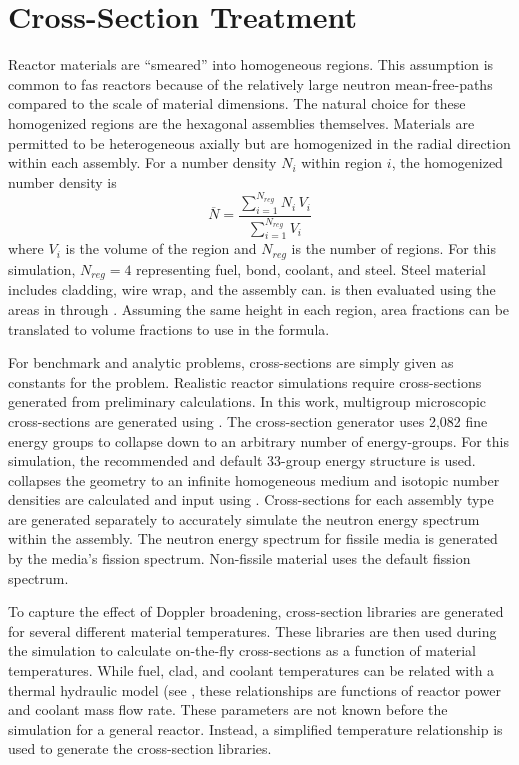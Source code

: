 \section{Cross-Section Treatment}
  \label{sec:cross_section_treatment}
  Reactor materials are ``smeared'' into homogeneous regions. This assumption is 
  common to fas reactors because of the relatively large neutron mean-free-paths
  compared to the scale of material dimensions. 
  The natural choice for these homogenized regions are the hexagonal
  assemblies themselves. Materials are permitted to be heterogeneous axially but
  are homogenized in the radial direction within each assembly. For a number
  density $N_i$ within region $i$, the homogenized number density is
  \begin{equation}
    \label{eq:homogenized_nden}
    \overline{N} = \frac{\sum_{i = 1}^{N_{reg}} N_i \, V_i}
      {\sum_{i=1}^{N_{reg}} V_i}
  \end{equation}
  where $V_i$ is the volume of the region and $N_{reg}$ is the number of
  regions. For this simulation, ${N_{reg}=4}$ representing fuel, bond, coolant,
  and steel. Steel material includes cladding, wire wrap, and the assembly can.
   is then evaluated using the areas in
   through . Assuming the same height
  in each region, area fractions can be translated to volume fractions to use in
  the formula.

  For benchmark and analytic problems, cross-sections are simply given as
  constants for the problem. Realistic reactor simulations require
  cross-sections generated from preliminary calculations. In this
  work, multigroup microscopic cross-sections are generated using 
  \mcc \cite{mcc}.
  The cross-section generator uses 2,082 fine energy groups to collapse down
  to an arbitrary number of energy-groups. For this simulation, the
  recommended and default 33-group energy structure is used. \mcc 
  collapses the geometry to an infinite homogeneous medium and isotopic number
  densities are calculated and input using .
  Cross-sections for each assembly type are generated separately to accurately
  simulate the neutron energy spectrum within the assembly. The neutron energy
  spectrum for fissile media is generated by the media's fission spectrum. 
  Non-fissile material uses the default  fission spectrum. 

  To capture the effect of Doppler broadening, cross-section libraries are
  generated for several different material temperatures. These libraries are
  then used during the simulation to calculate on-the-fly cross-sections as a
  function of material temperatures.
  While fuel, clad, and coolant temperatures can be related with a thermal
  hydraulic model (see , these relationships are 
  functions of reactor power and coolant mass flow rate. These parameters are
  not known before the simulation for a general reactor. Instead, a simplified
  temperature relationship is used to generate the cross-section libraries.

